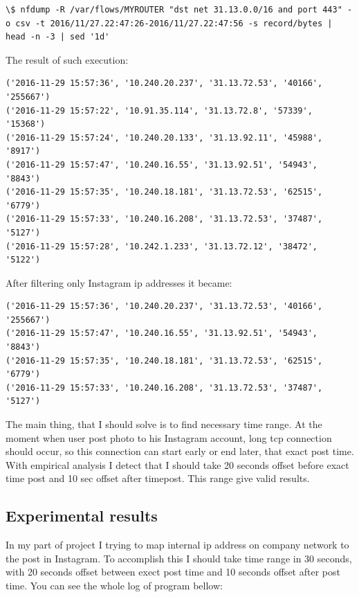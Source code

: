 \begin{lstlisting}
\$ nfdump -R /var/flows/MYROUTER "dst net 31.13.0.0/16 and port 443" -o csv -t 2016/11/27.22:47:26-2016/11/27.22:47:56 -s record/bytes | head -n -3 | sed '1d'
\end{lstlisting}

The result of such execution:

\begin{lstlisting}
('2016-11-29 15:57:36', '10.240.20.237', '31.13.72.53', '40166', '255667')
('2016-11-29 15:57:22', '10.91.35.114', '31.13.72.8', '57339', '15368')
('2016-11-29 15:57:24', '10.240.20.133', '31.13.92.11', '45988', '8917')
('2016-11-29 15:57:47', '10.240.16.55', '31.13.92.51', '54943', '8843')
('2016-11-29 15:57:35', '10.240.18.181', '31.13.72.53', '62515', '6779')
('2016-11-29 15:57:33', '10.240.16.208', '31.13.72.53', '37487', '5127')
('2016-11-29 15:57:28', '10.242.1.233', '31.13.72.12', '38472', '5122')
\end{lstlisting}

After filtering only Instagram ip addresses it became:

\begin{lstlisting}
('2016-11-29 15:57:36', '10.240.20.237', '31.13.72.53', '40166', '255667')
('2016-11-29 15:57:47', '10.240.16.55', '31.13.92.51', '54943', '8843')
('2016-11-29 15:57:35', '10.240.18.181', '31.13.72.53', '62515', '6779')
('2016-11-29 15:57:33', '10.240.16.208', '31.13.72.53', '37487', '5127')
\end{lstlisting}

The main thing, that I should solve is to find necessary time range. At the moment when user post photo to his Instagram account, long tcp connection should occur, so this connection can start early or end later, that exact post time. With empirical analysis I detect that I should take 20 seconds offset before exact time post and 10 sec offset after timepost. This range give valid results.

\subsection{Experimental results}
In my part of project I trying to map internal ip address on company network to the post in Instagram. To accomplish this I should take time range in 30 seconds, with 20 seconds offset between exect post time and 10 seconds offset after post time. You can see the whole log of program bellow:

